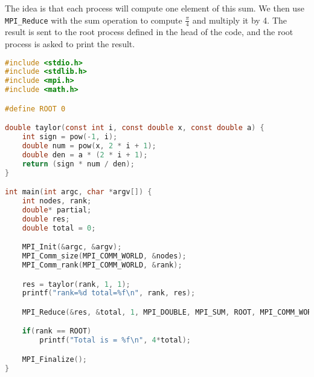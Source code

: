 The idea is that each process will compute one element of this sum. We then use \lstinline{MPI_Reduce} with the sum operation to compute \(\frac{\pi}{4}\) and multiply it by 4. The result is sent to the root process defined in the head of the code, and the root process is asked to print the result.

\begin{lstlisting}[language=C]
#include <stdio.h>
#include <stdlib.h>
#include <mpi.h>
#include <math.h>

#define ROOT 0

double taylor(const int i, const double x, const double a) {
    int sign = pow(-1, i);
    double num = pow(x, 2 * i + 1);
    double den = a * (2 * i + 1);
    return (sign * num / den);
}

int main(int argc, char *argv[]) {
    int nodes, rank;
    double* partial;
    double res;
    double total = 0;

    MPI_Init(&argc, &argv);
    MPI_Comm_size(MPI_COMM_WORLD, &nodes);
    MPI_Comm_rank(MPI_COMM_WORLD, &rank);

    res = taylor(rank, 1, 1);
    printf("rank=%d total=%f\n", rank, res);

    MPI_Reduce(&res, &total, 1, MPI_DOUBLE, MPI_SUM, ROOT, MPI_COMM_WORLD);

    if(rank == ROOT)
        printf("Total is = %f\n", 4*total);

    MPI_Finalize();
}
\end{lstlisting}

